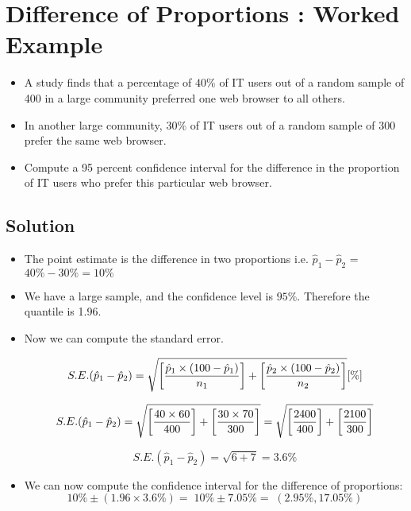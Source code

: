 \documentclass[a4paper,12pt]{article}
\begin{document}


\section*{Difference of Proportions : Worked Example}
\begin{itemize} \item
	A study finds that a percentage of $40\%$ of IT users out of a random sample of 400 in a large
	community preferred one web browser to all others. \item In another large community, $30\%$ of IT users out of a random sample
	of 300 prefer the same web browser. \item Compute a 95 percent confidence interval for the difference in the proportion of IT users who prefer this particular web browser. \end{itemize}



\subsection*{Solution}





\begin{itemize}
	\item The point estimate is the difference in two proportions i.e. $\hat{p}_1 - \hat{p}_2$ = $40 \% - 30 \% = 10 \%$
	\item We have a large sample, and the confidence level is $95\%$. Therefore the quantile is 1.96.
\item Now we can compute the standard error.

\[ S.E. (\hat{p}_1 - \hat{p}_2) =
\sqrt{ \left[{\hat{p}_1 \times (100 - \hat{p}_1) \over n_1}\right] + \left[{\hat{p}_2 \times (100 - \hat{p}_2) \over n_2}\right] } [\%] \]

\[ S.E. (\hat{p}_1 - \hat{p}_2) =
\sqrt{ \left[{40 \times 60 \over 400}\right] + \left[{30 \times 70 \over 300}\right] }  = \sqrt{ \left[{2400 \over 400}\right] + \left[{2100\over 300}\right] } \]

\[ S.E. (\hat{p}_1 - \hat{p}_2)
= \sqrt{ 6 + 7 } = 3.6\% \]

	\item We can now compute the confidence interval for the difference of proportions:
	\[ 10\% \pm (1.96 \times 3.6 \%)  =\; 10\% \pm 7.05 \% = \;(2.95\%, 17.05\%) \]
	
\end{itemize}
\end{document}

